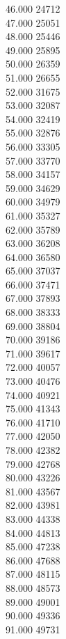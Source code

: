 { 46.000	24712 \\
 47.000	25051 \\
 48.000	25446 \\
 49.000	25895 \\
 50.000	26359 \\
 51.000	26655 \\
 52.000	31675 \\
 53.000	32087 \\
 54.000	32419 \\
 55.000	32876 \\
 56.000	33305 \\
 57.000	33770 \\
 58.000	34157 \\
 59.000	34629 \\
 60.000	34979 \\
 61.000	35327 \\
 62.000	35789 \\
 63.000	36208 \\
 64.000	36580 \\
 65.000	37037 \\
 66.000	37471 \\
 67.000	37893 \\
 68.000	38333 \\
 69.000	38804 \\
 70.000	39186 \\
 71.000	39617 \\
 72.000	40057 \\
 73.000	40476 \\
 74.000	40921 \\
 75.000	41343 \\
 76.000	41710 \\
 77.000	42050 \\
 78.000	42382 \\
 79.000	42768 \\
 80.000	43226 \\
 81.000	43567 \\
 82.000	43981 \\
 83.000	44338 \\
 84.000	44813 \\
 85.000	47238 \\
 86.000	47688 \\
 87.000	48115 \\
 88.000	48573 \\
 89.000	49001 \\
 90.000	49336 \\
 91.000	49731 \\
}
